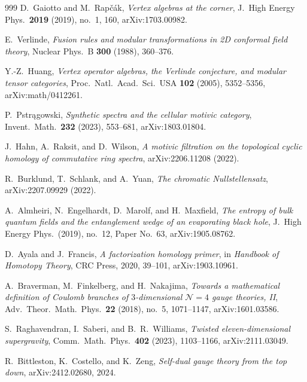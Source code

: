 \documentclass[11pt]{memoir}
\begin{document}
\begin{thebibliography}{999}
D.~Gaiotto and M.~Rap\v{c}\'ak, \emph{Vertex algebras at the corner}, J.\ High Energy Phys.\ \textbf{2019} (2019), no.~1, 160, arXiv:1703.00982.

E.~Verlinde, \emph{Fusion rules and modular transformations in 2D conformal field theory}, Nuclear Phys.\ B \textbf{300} (1988), 360--376.

Y.-Z.~Huang, \emph{Vertex operator algebras, the Verlinde conjecture, and modular tensor categories}, Proc.\ Natl.\ Acad.\ Sci.\ USA \textbf{102} (2005), 5352--5356, arXiv:math/0412261.

P.~Pstr\k{a}gowski, \emph{Synthetic spectra and the cellular motivic category},
Invent.\ Math.\ \textbf{232} (2023), 553--681, arXiv:1803.01804.

J.~Hahn, A.~Raksit, and D.~Wilson, \emph{A motivic filtration on the topological cyclic homology of commutative ring spectra}, arXiv:2206.11208 (2022).

R.~Burklund, T.~Schlank, and A.~Yuan, \emph{The chromatic Nullstellensatz}, arXiv:2207.09929 (2022).


A.~Almheiri, N.~Engelhardt, D.~Marolf, and H.~Maxfield, \emph{The entropy of bulk quantum fields and the entanglement wedge of an evaporating black hole}, J.\ High Energy Phys.\ (2019), no.~12, Paper No.~63, arXiv:1905.08762.

D.~Ayala and J.~Francis, \emph{A factorization homology primer}, in \emph{Handbook of Homotopy Theory}, CRC Press, 2020, 39--101, arXiv:1903.10961.

A.~Braverman, M.~Finkelberg, and H.~Nakajima, \emph{Towards a mathematical definition of Coulomb branches of $3$-dimensional $\mathcal{N}=4$ gauge theories, II}, Adv.\ Theor.\ Math.\ Phys.\ \textbf{22} (2018), no.~5, 1071--1147, arXiv:1601.03586.

S.~Raghavendran, I.~Saberi, and B.~R.~Williams, \emph{Twisted eleven-dimensional supergravity}, Comm.\ Math.\ Phys.\ \textbf{402} (2023), 1103--1166, arXiv:2111.03049.

R.~Bittleston, K.~Costello, and K.~Zeng, \emph{Self-dual gauge theory from the top down}, arXiv:2412.02680, 2024.


\end{thebibliography}
\end{document}
